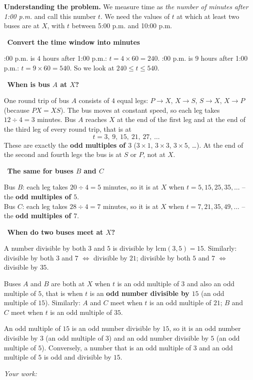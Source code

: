 \documentclass[11pt]{article}
\newif\ifsol \solfalse
\newcommand{\StuProb}[2]{\begin{probboxS}{#1}{#2}\StuProbBody\end{probboxS}}
\newcommand{\probsol}[1]{%
  \begin{lrbox}{\solmeasure}\begin{minipage}{\dimexpr\linewidth-24pt\relax}#1\end{minipage}\end{lrbox}%
  \ifsol
    \begin{solbox}#1\end{solbox}%
  \else
    \setlength{\solht}{\dimexpr\ht\solmeasure+\dp\solmeasure+0.85cm\relax}%
    \ifdim\solht<1.35cm\setlength{\solht}{1.35cm}\fi
    \ifdim\solht>\StudentMaxWork\setlength{\solht}{\StudentMaxWork}\fi
    \par\noindent\begin{minipage}{\linewidth}%
    \expandafter\StuProb\StuProbArgs
    \begin{tcolorbox}[colback=white,colframe=Line,boxrule=0.8pt,arc=5pt,
      left=8pt,right=8pt,top=4pt,bottom=4pt,height=\solht]{\footnotesize\color{Slate}\itshape\WorkWord}\end{tcolorbox}%
    \end{minipage}\par\medskip
  \fi}
\newlength{\StudentMaxWork}\setlength{\StudentMaxWork}{4.5cm}
\newcommand{\step}[2]{\par\smallskip\noindent{\bfseries\color{tmBlue!85!black}\StepWord~#1.}\ {\bfseries #2}\par\nopagebreak}
\def\WorkWord{Your work:}
\def\StepWord{Step}
\begin{document}
\probsol{
\textbf{Understanding the problem.} We measure time as \emph{the number of minutes after 1:00 p.m.} and call this number $t$.
We need the values of $t$ at which at least two buses are at $X$, with $t$ between 5:00 p.m. and 10:00 p.m.

\step{1}{Convert the time window into minutes}
5:00 p.m. is $4$ hours after 1:00 p.m.: $t=4\times60=240$. \quad 10:00 p.m. is $9$ hours after 1:00 p.m.: $t=9\times60=540$.
So we look at $240\le t\le540$.

\step{2}{When is bus $A$ at $X$?}
One round trip of bus $A$ consists of $4$ equal legs: $P\to X$, $X\to S$, $S\to X$, $X\to P$ (because $PX=XS$).
The bus moves at constant speed, so each leg takes $12\div4=3$ minutes. Bus $A$ reaches $X$ at the end of the first leg and at the end
of the third leg of every round trip, that is at
\[t=3,\ 9,\ 15,\ 21,\ 27,\ \dots\]
These are exactly the \textbf{odd multiples of $3$} ($3\times1$, $3\times3$, $3\times5$, \dots). At the end of the second and fourth legs
the bus is at $S$ or $P$, not at $X$.

\step{3}{The same for buses $B$ and $C$}
Bus $B$: each leg takes $20\div4=5$ minutes, so it is at $X$ when $t=5,15,25,35,\dots$ -- the \textbf{odd multiples of $5$}.\\
Bus $C$: each leg takes $28\div4=7$ minutes, so it is at $X$ when $t=7,21,35,49,\dots$ -- the \textbf{odd multiples of $7$}.

\step{4}{When do two buses meet at $X$?}
\begin{recallbox}A number divisible by both $3$ and $5$ is divisible by $\text{lcm}(3,5)=15$. Similarly:
divisible by both $3$ and $7$ $\Leftrightarrow$ divisible by $21$; divisible by both $5$ and $7$ $\Leftrightarrow$
divisible by $35$.\end{recallbox}
Buses $A$ and $B$ are both at $X$ when $t$ is an odd multiple of $3$ and also an odd multiple of $5$, that is when $t$ is an
\textbf{odd number divisible by $15$} (an odd multiple of $15$). Similarly: $A$ and $C$ meet when $t$ is an odd multiple of $21$;
$B$ and $C$ meet when $t$ is an odd multiple of $35$.
\begin{proofbox}An odd multiple of $15$ is an odd number divisible by $15$, so it is an odd number divisible by $3$ (an odd multiple of $3$)
and an odd number divisible by $5$ (an odd multiple of $5$). Conversely, a number that is an odd multiple of $3$ and an odd multiple of $5$ is
odd and divisible by $15$.\end{proofbox}

}
\end{document}
